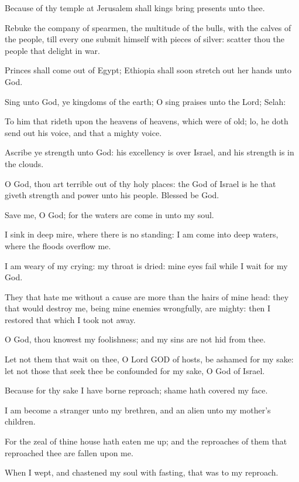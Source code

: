 \Verse Because of thy temple at Jerusalem shall kings bring presents unto thee.

\Verse Rebuke the company of spearmen, the multitude of the bulls, with the calves of the people, till every one submit himself with pieces of silver: scatter thou the people that delight in war.

\Verse Princes shall come out of Egypt; Ethiopia shall soon stretch out her hands unto God.

\Verse Sing unto God, ye kingdoms of the earth; O sing praises unto the Lord; Selah:

\Verse To him that rideth upon the heavens of heavens, which were of old; lo, he doth send out his voice, and that a mighty voice.

\Verse Ascribe ye strength unto God: his excellency is over Israel, and his strength is in the clouds.

\Verse O God, thou art terrible out of thy holy places: the God of Israel is he that giveth strength and power unto his people. Blessed be God.




\Chapter
\Verse Save me, O God; for the waters are come in unto my soul.

\Verse I sink in deep mire, where there is no standing: I am come into deep waters, where the floods overflow me.

\Verse I am weary of my crying: my throat is dried: mine eyes fail while I wait for my God.

\Verse They that hate me without a cause are more than the hairs of mine head: they that would destroy me, being mine enemies wrongfully, are mighty: then I restored that which I took not away.

\Verse O God, thou knowest my foolishness; and my sins are not hid from thee.

\Verse Let not them that wait on thee, O Lord GOD of hosts, be ashamed for my sake: let not those that seek thee be confounded for my sake, O God of Israel.

\Verse Because for thy sake I have borne reproach; shame hath covered my face.

\Verse I am become a stranger unto my brethren, and an alien unto my mother's children.

\Verse For the zeal of thine house hath eaten me up; and the reproaches of them that reproached thee are fallen upon me.

\Verse When I wept, and chastened my soul with fasting, that was to my reproach.

